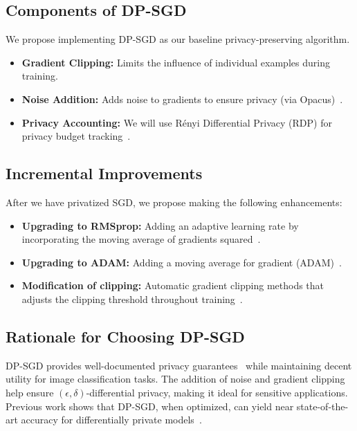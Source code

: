 \subsection{Components of DP-SGD}\label{subsec:components-of-dp-sgd}
We propose implementing DP-SGD as our baseline privacy-preserving algorithm.
\begin{itemize}
    \item \textbf{Gradient Clipping:} Limits the influence of individual examples during training.
    \item \textbf{Noise Addition:} Adds noise to gradients to ensure privacy (via Opacus)~\cite{opacus}.
    \item \textbf{Privacy Accounting:} We will use Rényi Differential Privacy (RDP) for privacy budget tracking~\cite{Mironov_2017_RenyiDP}.
\end{itemize}

\subsection{Incremental Improvements}\label{subsec:incremental-improvements}
After we have privatized SGD, we propose making the following enhancements:
\begin{itemize}
    \item \textbf{Upgrading to RMSprop:} Adding an adaptive learning rate by incorporating the moving average of gradients squared~\cite{DBLP:journals/corr/abs-1807-06766}.
    \item \textbf{Upgrading to ADAM:} Adding a moving average for gradient (ADAM)~\cite{DBLP:journals/corr/abs-1807-06766}.
    \item \textbf{Modification of clipping:} Automatic gradient clipping methods that adjusts the clipping threshold throughout training~\cite{bu2023automaticclippingdifferentiallyprivate}.
\end{itemize}

\subsection{Rationale for Choosing DP-SGD}\label{subsec:rationale-for-choosing-dp-sgd}
DP-SGD provides well-documented privacy guarantees~\cite{Abadi_2016_DeepLearningDifferentialPrivacy}
while maintaining decent utility for image classification tasks.
The addition of noise and gradient clipping help ensure $(\epsilon, \delta)$-differential privacy,
making it ideal for sensitive applications.
Previous work shows that DP-SGD, when optimized, can yield near state-of-the-art accuracy
for differentially private models~\cite{De_2022_ScaleDP_ImageClassification}.

